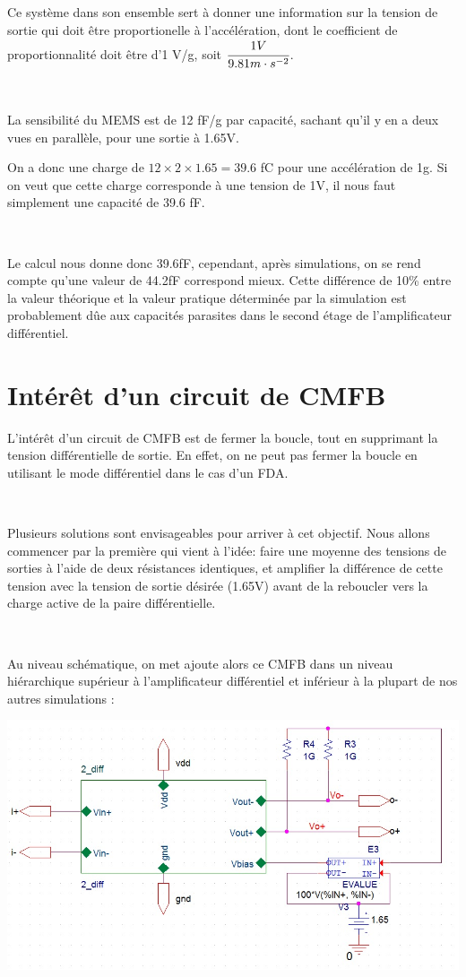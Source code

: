 \documentclass{article}
\begin{document}
Ce système dans son ensemble sert à donner une information sur la tension de sortie qui doit être proportionelle à l’accélération, dont le coefficient de proportionnalité doit être d’1 V/g, soit $\cfrac{1 V}{9.81 m\cdot s^{-2}}$.

~

La sensibilité du MEMS est de 12 fF/g par capacité, sachant qu’il y en a deux vues en parallèle, pour une sortie à 1.65V.

On a donc une charge de $12\times2\times1.65=39.6$ fC pour une accélération de 1g. Si on veut que cette charge corresponde à une tension de 1V, il nous faut simplement une capacité de 39.6 fF.

~

Le calcul nous donne donc 39.6fF, cependant, après simulations, on se rend compte qu’une valeur de 44.2fF correspond mieux.
Cette différence de 10\% entre la valeur théorique et la valeur pratique déterminée par la simulation est probablement dûe aux capacités parasites dans le second étage de l’amplificateur différentiel.

\section{Intérêt d’un circuit de CMFB}

L’intérêt d’un circuit de CMFB est de fermer la boucle, tout en supprimant la tension différentielle de sortie. En effet, on ne peut pas fermer la boucle en utilisant le mode différentiel dans le cas d’un FDA.

~

Plusieurs solutions sont envisageables pour arriver à cet objectif. Nous allons commencer par la première qui vient à l’idée: faire une moyenne des tensions de sorties à l’aide de deux résistances identiques, et amplifier la différence de cette tension avec la tension de sortie désirée (1.65V) avant de la reboucler vers la charge active de la paire différentielle.

~

Au niveau schématique, on met ajoute alors ce CMFB dans un niveau hiérarchique supérieur à l’amplificateur différentiel et inférieur à la plupart de nos autres simulations :

\includegraphics[width=\linewidth]{schema_rebouclage.png}
\end{document}
